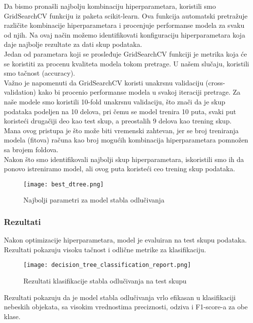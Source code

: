 \documentclass[a4paper,12pt]{article}
\begin{document}
Da bismo pronašli najbolju kombinaciju hiperparametara, koristili smo GridSearchCV funkciju iz paketa scikit-learn. Ova funkcija automatski pretražuje različite kombinacije hiperparametara i procenjuje performanse modela za svaku od njih. Na ovaj način možemo identifikovati konfiguraciju hiperparametara koja daje najbolje rezultate za dati skup podataka.\\
Jedan od parametara koji se prosleđuje GridSearchCV funkciji je metrika koja će se koristiti za procenu kvaliteta modela tokom pretrage. U našem slučaju, koristili smo tačnost (accuracy).\\
Važno je napomenuti da GridSearchCV koristi unakrsnu validaciju (cross-validation) kako bi procenio performanse modela u svakoj iteraciji pretrage. Za naše modele smo koristili 10-fold unakrsnu validaciju, što znači da je skup podataka podeljen na 10 delova, pri čemu se model trenira 10 puta, svaki put koristeći drugačiji deo kao test skup, a preostalih 9 delova kao trening skup.\\
Mana ovog pristupa je što može biti vremenski zahtevan, jer se broj treniranja modela (fitova) računa kao broj mogućih kombinacija hiperparametara pomnožen sa brojem foldova.\\
Nakon što smo identifikovali najbolji skup hiperparametara, iskoristili smo ih da ponovo istreniramo model, ali ovog puta koristeći ceo trening skup podataka.

\begin{figure}[H]
\centering
\texttt{[image: best\_dtree.png]}
\caption{Najbolji parametri za model stabla odlučivanja}
\label{fig:best_dtree}
\end{figure}

\subsubsection{Rezultati}

Nakon optimizacije hiperparametara, model je evaluiran na test skupu podataka. Rezultati pokazuju visoku tačnost i odlične metrike za klasifikaciju.

\begin{figure}[H]
\centering
\texttt{[image: decision\_tree\_classification\_report.png]}
\caption{Rezultati klasifikacije stabla odlučivanja na test skupu}
\label{fig:decision_tree_classification_report}
\end{figure}

Rezultati pokazuju da je model stabla odlučivanja vrlo efikasan u klasifikaciji nebeskih objekata, sa visokim vrednostima preciznosti, odziva i F1-score-a za obe klase.
\end{document}

